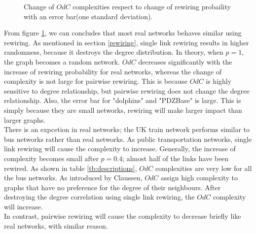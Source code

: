 \documentclass[12pt]{article}
\begin{document}
{\begin{figure}[ht]
    \caption{Change of $OdC$ complexities respect to change of rewiring probaility with an error bar(one standard deviation).}
    \label{fig:rewiring}
\end{figure}
\noindent
From figure \ref{fig:rewiring}, we can concludes that most real networks behaves similar using rewiring. As mentioned in section \ref{rewiring}, single link rewiring results in higher randomness, because it destroys the degree distribution. In theory, when $p=1$, the graph becomes a random network. $OdC$ decreases significantly with the increase of rewiring probability for real networks, whereas the change of complexity is not large for pairwise rewiring. This is because $OdC$ is highly sensitive to degree relationship, but pairwise rewiring does not change the degree relationship. Also, the error bar for "dolphins" and "PDZBase" is large. This is simply because they are small networks, rewiring will make larger impact than larger graphs.\\
There is an expcetion in real networks; the UK train network performs similar to bus networks rather than real networks. As public transportation networks, single link rewiring will cause the complexity to increase. Generally, the increase of complexity becomes small after $p=0.4$; almost half of the links have been rewired. As shown in table \ref{tb:descriptions}, $OdC$ complexities are very low for all the bus networks. As introduced by Claussen\cite{odc}, $OdC$ assign high complexity to graphs that have no preference for the degree of their neighbours. After destroying the degree correlation using single link rewiring, the $OdC$ complexity will increase.\\
\newline
In contrast, pairwise rewiring will cause the complexity to decrease briefly like real networks, with similar reason.

\clearpage
}
\end{document}
